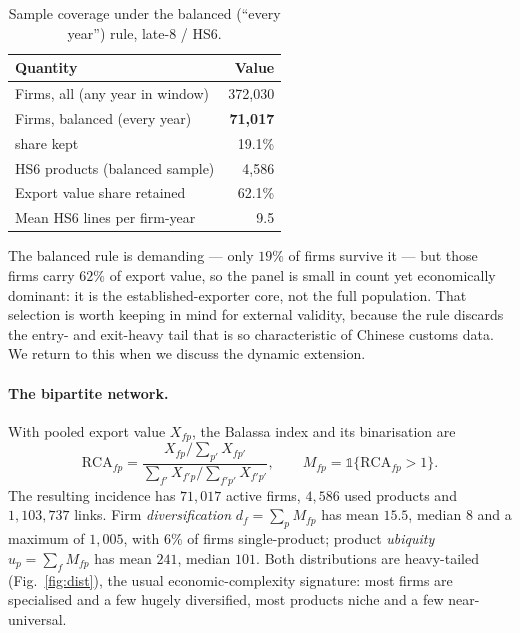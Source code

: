 \documentclass[11pt]{article}
\begin{document}
\begin{table}[H]\centering\small
\caption{Sample coverage under the balanced (``every year'') rule, late-8 / HS6.}
\label{tab:coverage}
\begin{tabular}{@{}lr@{}}
\toprule
Quantity & Value \\
\midrule
Firms, all (any year in window)           & 372{,}030 \\
Firms, balanced (every year)              & \textbf{71{,}017} \\
\quad share kept                          & 19.1\% \\
HS6 products (balanced sample)            & 4{,}586 \\
Export value share retained               & 62.1\% \\
Mean HS6 lines per firm-year              & 9.5 \\
\bottomrule
\end{tabular}
\end{table}

The balanced rule is demanding --- only $19\%$ of firms survive it --- but those firms carry $62\%$ of export
value, so the panel is small in count yet economically dominant: it is the established-exporter core, not the
full population. That selection is worth keeping in mind for external validity, because the rule discards the
entry- and exit-heavy tail that is so characteristic of Chinese customs data. We return to this when we discuss
the dynamic extension.

\paragraph{The bipartite network.}
With pooled export value $X_{fp}$, the Balassa index and its binarisation are
\begin{equation}
\mathrm{RCA}_{fp}=\frac{X_{fp}\big/\sum_{p'}X_{fp'}}{\sum_{f'}X_{f'p}\big/\sum_{f'p'}X_{f'p'}},
\qquad M_{fp}=\mathbb{1}\{\mathrm{RCA}_{fp}>1\}.
\end{equation}
The resulting incidence has $71{,}017$ active firms, $4{,}586$ used products and $1{,}103{,}737$ links. Firm
\emph{diversification} $d_f=\sum_p M_{fp}$ has mean $15.5$, median $8$ and a maximum of $1{,}005$, with $6\%$ of
firms single-product; product \emph{ubiquity} $u_p=\sum_f M_{fp}$ has mean $241$, median $101$. Both
distributions are heavy-tailed (Fig.~\ref{fig:dist}), the usual economic-complexity signature: most firms are
specialised and a few hugely diversified, most products niche and a few near-universal.
\end{document}
